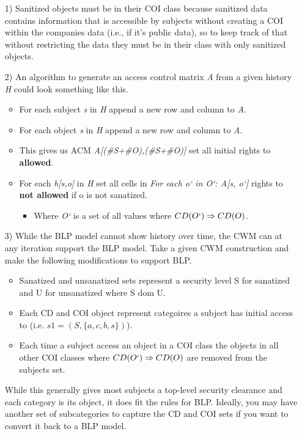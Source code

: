 \documentclass[journal,onecolumn]{IEEEtran}
\begin{document}
\begin{enumerate}
  \item [1)] Sanitized objects must be in their COI class because sanitized data contains information that is accessible by subjects without creating a COI within the companies data (i.e., if it's public data), so to keep track of that without restricting the data they must be in their class with only sanitized objects. 
  \item [2)] An algorithm to generate an access control matrix \textit{A} from a given history \textit{H} could look something like this. 
  \begin{itemize}
    \item For each subject \textit{s} in \textit{H} append a new row and column to \textit{A}. 
    \item For each object \textit{s} in \textit{H} append a new row and column to \textit{A}. 
    \item This gives us ACM \textit{A[(\#S+\#O),(\#S+\#O)]} set all initial rights to \textbf{allowed}.
    \item For each \textit{h[s,o]} in \textit{H} set all cells in \textit{For each o` in O`: A[s, o`]} rights to \textbf{not allowed} if o is not sanatized. 
    \begin{itemize}
      \item Where \textit{O`} is a set of all values where \textit{$CD(O`) \Rightarrow CD(O)$}.
    \end{itemize}
  \end{itemize}
  \item [3)] While the BLP model cannot show history over time, the CWM can at any iteration support the BLP model. Take a given CWM construction and make the following modifications to support BLP. 
  \begin{itemize}
    \item Sanatized and unsanatized sets represent a security level S for sanatized and U for unsanatized where S dom U.
    \item Each CD and COI object represent categoires a subject has initial access to (i.e. $s1 = (S,\{a, c, b, s\})$).
    \item Each time a subject access an object in a COI class the objects in all other COI classes where \textit{$CD(O`) \Rightarrow CD(O)$} are removed from the subjects set. 
  \end{itemize}
  While this generally gives most subjects a top-level security clearance and each category is its object, it does fit the rules for BLP. Ideally, you may have another set of subcategories to capture the CD and COI sets if you want to convert it back to a BLP model.  
\end{enumerate}
\end{document}
